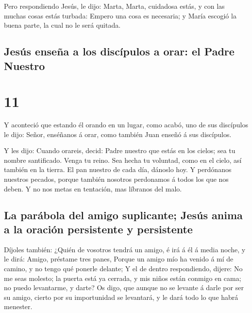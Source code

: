  Pero respondiendo Jesús, le dijo: Marta, Marta,
cuidadosa estás, y con las muchas cosas estás turbada: 
Empero una cosa es necesaria; y María escogió la buena parte, la cual no
le será quitada.

\hypertarget{jesuxfas-enseuxf1a-a-los-discuxedpulos-a-orar-el-padre-nuestro}{%
\subsection{Jesús enseña a los discípulos a orar: el Padre
Nuestro}\label{jesuxfas-enseuxf1a-a-los-discuxedpulos-a-orar-el-padre-nuestro}}

\hypertarget{section-42-11}{%
\section{11}\label{section-42-11}}

 Y aconteció que estando él orando en un lugar, como
acabó, uno de sus discípulos le dijo: Señor, enséñanos á orar, como
también Juan enseñó á sus discípulos.

 Y les dijo: Cuando orareis, decid: Padre nuestro que
estás en los cielos; sea tu nombre santificado. Venga tu reino. Sea
hecha tu voluntad, como en el cielo, así también en la tierra.
 El pan nuestro de cada día, dánoslo hoy.  Y
perdónanos nuestros pecados, porque también nosotros perdonamos á todos
los que nos deben. Y no nos metas en tentación, mas líbranos del malo.

\hypertarget{la-paruxe1bola-del-amigo-suplicante-jesuxfas-anima-a-la-oraciuxf3n-persistente-y-persistente}{%
\subsection{La parábola del amigo suplicante; Jesús anima a la oración
persistente y
persistente}\label{la-paruxe1bola-del-amigo-suplicante-jesuxfas-anima-a-la-oraciuxf3n-persistente-y-persistente}}

 Díjoles también: ¿Quién de vosotros tendrá un amigo, é
irá á él á media noche, y le dirá: Amigo, préstame tres panes,
 Porque un amigo mío ha venido á mí de camino, y no tengo
qué ponerle delante;  Y el de dentro respondiendo, dijere:
No me seas molesto; la puerta está ya cerrada, y mis niños están conmigo
en cama; no puedo levantarme, y darte?  Os digo, que
aunque no se levante á darle por ser su amigo, cierto por su
importunidad se levantará, y le dará todo lo que habrá menester.

